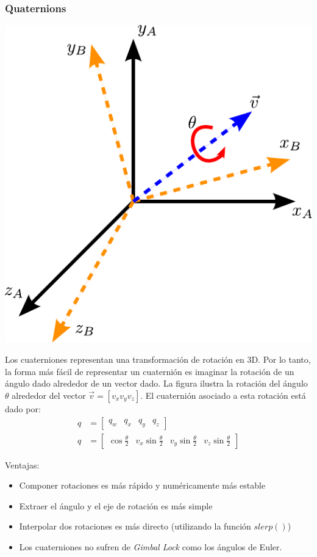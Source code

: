 \begin{frame}
    \frametitle{Quaternions}
    \scriptsize
    \begin{center}
        \includegraphics[width=0.2\columnwidth]{./images/quaternion.pdf}
    \end{center}

    Los cuaterniones representan una transformación de rotación en 3D. Por lo tanto, la forma más fácil de representar un cuaternión es imaginar la rotación de un ángulo dado alrededor de un vector dado. La figura ilustra la rotación del ángulo $\theta$ alrededor del vector $\vec{v} = [v_{x} v_{y} v_{z}]$. El cuaternión asociado a esta rotación está dado por:
    \begin{align*}
        q &= \begin{bmatrix} q_w & q_x & q_y & q_z\end{bmatrix}\\
        q &= \begin{bmatrix}
            \cos \frac{\theta}{2} & v_{x} \sin \frac{\theta}{2} & v_{y} \sin \frac{\theta}{2} & v_{z}\sin \frac{\theta}{2}
        \end{bmatrix}
    \end{align*}

    Ventajas:
    \begin{itemize}
        \item Componer rotaciones es más rápido y numéricamente más estable
        \item Extraer el ángulo y el eje de rotación es más simple
        \item Interpolar dos rotaciones es más directo (utilizando la función $slerp()$)
        \item Los cuaterniones no sufren de \emph{Gimbal Lock} como los ángulos de Euler.
    \end{itemize}

\end{frame}
